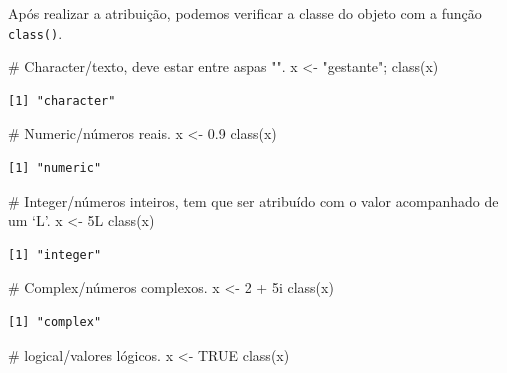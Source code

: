 \documentclass[
  letterpaper,
  DIV=11,
  numbers=noendperiod]{scrreprt}
\newenvironment{Shaded}{\begin{snugshade}}{\end{snugshade}}
\newcommand{\CommentTok}[1]{\textcolor[rgb]{0.37,0.37,0.37}{#1}}
\newcommand{\ConstantTok}[1]{\textcolor[rgb]{0.56,0.35,0.01}{#1}}
\newcommand{\DecValTok}[1]{\textcolor[rgb]{0.68,0.00,0.00}{#1}}
\newcommand{\FloatTok}[1]{\textcolor[rgb]{0.68,0.00,0.00}{#1}}
\newcommand{\FunctionTok}[1]{\textcolor[rgb]{0.28,0.35,0.67}{#1}}
\newcommand{\NormalTok}[1]{\textcolor[rgb]{0.00,0.23,0.31}{#1}}
\newcommand{\OtherTok}[1]{\textcolor[rgb]{0.00,0.23,0.31}{#1}}
\newcommand{\SpecialCharTok}[1]{\textcolor[rgb]{0.37,0.37,0.37}{#1}}
\newcommand{\StringTok}[1]{\textcolor[rgb]{0.13,0.47,0.30}{#1}}
\begin{document}
Após realizar a atribuição, podemos verificar a classe do objeto com a
função \texttt{class()}.

\begin{Shaded}
\begin{Highlighting}[]
\CommentTok{\# Character/texto, deve estar entre aspas "".}
\NormalTok{x }\OtherTok{\textless{}{-}} \StringTok{"gestante"}\NormalTok{; }
\FunctionTok{class}\NormalTok{(x) }
\end{Highlighting}
\end{Shaded}

\begin{verbatim}
[1] "character"
\end{verbatim}

\begin{Shaded}
\begin{Highlighting}[]
\CommentTok{\# Numeric/números reais.}
\NormalTok{x }\OtherTok{\textless{}{-}} \FloatTok{0.9} 
\FunctionTok{class}\NormalTok{(x) }
\end{Highlighting}
\end{Shaded}

\begin{verbatim}
[1] "numeric"
\end{verbatim}

\begin{Shaded}
\begin{Highlighting}[]
\CommentTok{\# Integer/números inteiros, tem que ser atribuído com o valor acompanhado de um ‘L’.}
\NormalTok{x }\OtherTok{\textless{}{-}}\NormalTok{ 5L}
\FunctionTok{class}\NormalTok{(x)}
\end{Highlighting}
\end{Shaded}

\begin{verbatim}
[1] "integer"
\end{verbatim}

\begin{Shaded}
\begin{Highlighting}[]
\CommentTok{\# Complex/números complexos.}
\NormalTok{x }\OtherTok{\textless{}{-}} \DecValTok{2} \SpecialCharTok{+}\NormalTok{ 5i}
\FunctionTok{class}\NormalTok{(x)}
\end{Highlighting}
\end{Shaded}

\begin{verbatim}
[1] "complex"
\end{verbatim}

\begin{Shaded}
\begin{Highlighting}[]
\CommentTok{\# logical/valores lógicos.}
\NormalTok{x }\OtherTok{\textless{}{-}} \ConstantTok{TRUE}
\FunctionTok{class}\NormalTok{(x)}
\end{Highlighting}
\end{Shaded}
\end{document}
